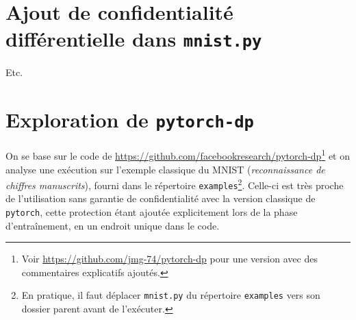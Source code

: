 \documentclass[a4paper,11pt]{article} %
\newcommand{\ttt}[1]{\texttt{#1}}
\begin{document}
\section{Ajout de confidentialité différentielle dans \ttt{mnist.py}}
Etc.

\section{Exploration de \texttt{pytorch-dp}}
On se base sur le code de \url{https://github.com/facebookresearch/pytorch-dp}\footnote{Voir \url{https://github.com/jmg-74/pytorch-dp} pour une version avec des commentaires explicatifs ajoutés.} et on analyse une exécution sur l'exemple classique du MNIST (\emph{reconnaissance de chiffres manuscrits}), fourni dans le répertoire \ttt{examples}\footnote{En pratique, il faut déplacer \ttt{mnist.py} du répertoire \ttt{examples} vers son dossier parent avant de l'exécuter.}. Celle-ci est très proche de l'utilisation sans garantie de confidentialité avec la version classique de \ttt{pytorch}, cette protection étant ajoutée explicitement lors de la phase d'entraînement, en un endroit unique dans le code.
%
\end{document}
